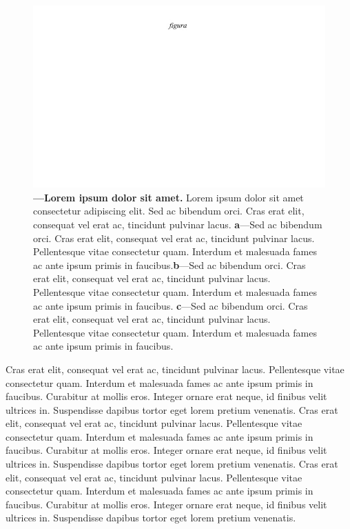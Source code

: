 \documentclass[./main.tex]{subfiles}
\begin{document}
\begin{figure}[t!] 
\centering				
\includegraphics[width=0.98\linewidth]{figs/fig_m.jpg}		
\caption[Lorem ipsum dolor sit amet]
{\textbf{---\;Lorem ipsum dolor sit amet.}
    Lorem ipsum dolor sit amet consectetur adipiscing elit. Sed ac bibendum orci. Cras erat elit, consequat vel erat ac, tincidunt pulvinar lacus. \;\textbf{a}\;---\;Sed ac bibendum orci. Cras erat elit, consequat vel erat ac, tincidunt pulvinar lacus. Pellentesque vitae consectetur quam. Interdum et malesuada fames ac ante ipsum primis in faucibus.\;\textbf{b}\;---\;Sed ac bibendum orci. Cras erat elit, consequat vel erat ac, tincidunt pulvinar lacus. Pellentesque vitae consectetur quam. Interdum et malesuada fames ac ante ipsum primis in faucibus. \;\textbf{c}\;---\;Sed ac bibendum orci. Cras erat elit, consequat vel erat ac, tincidunt pulvinar lacus. Pellentesque vitae consectetur quam. Interdum et malesuada fames ac ante ipsum primis in faucibus.
}
\label{fig:eco:intro} 		
\end{figure}

\par Cras erat elit, consequat vel erat ac, tincidunt pulvinar lacus. Pellentesque vitae consectetur quam. Interdum et malesuada fames ac ante ipsum primis in faucibus. Curabitur at mollis eros. Integer ornare erat neque, id finibus velit ultrices in. Suspendisse dapibus tortor eget lorem pretium venenatis. Cras erat elit, consequat vel erat ac, tincidunt pulvinar lacus. Pellentesque vitae consectetur quam. Interdum et malesuada fames ac ante ipsum primis in faucibus. Curabitur at mollis eros. Integer ornare erat neque, id finibus velit ultrices in. Suspendisse dapibus tortor eget lorem pretium venenatis. Cras erat elit, consequat vel erat ac, tincidunt pulvinar lacus. Pellentesque vitae consectetur quam. Interdum et malesuada fames ac ante ipsum primis in faucibus. Curabitur at mollis eros. Integer ornare erat neque, id finibus velit ultrices in. Suspendisse dapibus tortor eget lorem pretium venenatis.
\end{document}
